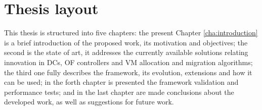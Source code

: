 \documentclass[12pt,english,oneside]{book}
\begin{document}



\section{Thesis layout}
\hspace{0.6cm}

This thesis is structured into five chapters: the present Chapter \ref{cha:introduction} is a brief introduction of the proposed work, its motivation and objectives; the second is the state of art, it addresses the currently available solutions relating innovation in DCs, OF controllers and VM allocation and migration algorithms; the third one fully describes the framework, its evolution, extensions and how it can be used; in the forth chapter is presented the framework validation and performance tests; and in the last chapter are made conclusions about the developed work, as well as suggestions for future work.
\end{document}
